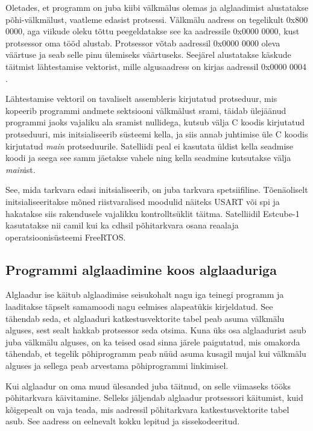 \documentclass[12pt,a4paper]{article}
\begin{document}
Oletades, et programm on juba kiibi välkmälus olemas ja alglaadimist
alustatakse põhi-välkmälust, vaatleme edasist protsessi. Välkmälu aadress on
tegelikult 0x800 0000, aga viikude oleku tõttu peegeldatakse see ka aadressile
0x0000 0000, kust protsessor oma tööd alustab.  Protsessor võtab aadressil
0x0000 0000 oleva väärtuse ja seab selle pinu ülemiseks väärtuseks. Seejärel
alustatakse käskude täitmist lähtestamise vektorist, mille algusaadress on
kirjas aadressil 0x0000 0004 \cite{f1rm}.

Lähtestamise vektoril on tavaliselt assembleris kirjutatud protseduur, mis
kopeerib programmi andmete sektsiooni välkmälust \gls{sram}i, täidab ülejäänud
programmi jaoks vajaliku ala \gls{sram}ist nullidega, kutsub välja C koodis
kirjutatud protseduuri, mis initsialiseerib süsteemi kella, ja siis annab
juhtimise üle C koodis kirjutatud \textit{main} protseduurile. Satelliidi peal
ei kasutata üldist kella seadmise koodi ja seega see samm jäetakse vahele ning
kella seadmine kutsutakse välja \textit{main}ist.

See, mida tarkvara edasi initsialiseerib, on juba tarkvara spetsiifiline.
Tõenäoliselt initsialiseeritakse mõned riistvaralised moodulid näiteks USART või
\gls{spi} ja hakatakse siis rakendusele vajalikku kontrolltsüklit täitma.
Satelliidil Estcube-1 kasutatakse nii \gls{cam}il kui ka \gls{cdhs}il
põhitarkvara osana reaalaja operatsioonisüsteemi FreeRTOS.

\subsection{Programmi alglaadimine koos alglaaduriga}
Alglaadur ise käitub alglaadimise seisukohalt nagu iga teinegi programm ja
laaditakse täpselt samamoodi nagu eelmises alapeatükis kirjeldatud. See tähendab
seda, et alglaaduri katkestusvektorite tabel peab asuma välkmälu alguses, sest
sealt hakkab protsessor seda otsima. Kuna üks osa alglaadurist asub juba
välkmälu alguses, on ka teised osad sinna järele paigutatud, mis omakorda
tähendab, et tegelik põhiprogramm peab nüüd asuma kusagil mujal kui välkmälu
alguses ja sellega peab arvestama põhiprogrammi linkimisel.

Kui alglaadur on oma muud ülesanded juba täitnud, on selle viimaseks tööks
põhitarkvara käivitamine. Selleks jäljendab alglaadur protsessori käitumist,
kuid kõigepealt on vaja teada, mis aadressil põhitarkvara katkestusvektorite
tabel asub. See aadress on eelnevalt kokku lepitud ja sissekodeeritud.
\end{document}
